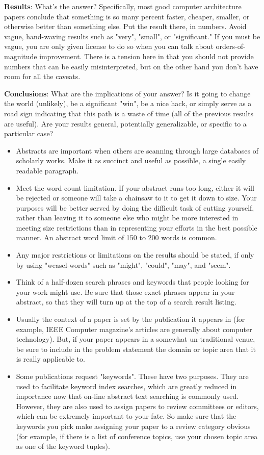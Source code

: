\documentclass[12pt,a4paper]{article}
\begin{document}
	 \textbf{Results}:
	 What's the answer? Specifically, most good computer architecture papers conclude that something is so many percent faster, cheaper, smaller, or otherwise better than something else. Put the result there, in numbers. Avoid vague, hand-waving results such as "very", "small", or "significant." If you must be vague, you are only given license to do so when you can talk about orders-of-magnitude improvement. There is a tension here in that you should not provide numbers that can be easily misinterpreted, but on the other hand you don't have room for all the caveats.
	 
	 \textbf{Conclusions}:
	 What are the implications of your answer? Is it going to change the world (unlikely), be a significant "win", be a nice hack, or simply serve as a road sign indicating that this path is a waste of time (all of the previous results are useful). Are your results general, potentially generalizable, or specific to a particular case?
	
	\begin{itemize}
		\item Abstracts are important when others are scanning through large databases of scholarly works. Make it as succinct and useful as possible, a single easily readable paragraph.
		\item Meet the word count limitation. If your abstract runs too long, either it will be rejected or someone will take a chainsaw to it to get it down to size. Your purposes will be better served by doing the difficult task of cutting yourself, rather than leaving it to someone else who might be more interested in meeting size restrictions than in representing your efforts in the best possible manner. An abstract word limit of 150 to 200 words is common.
		\item Any major restrictions or limitations on the results should be stated, if only by using "weasel-words" such as "might", "could", "may", and "seem".
		\item Think of a half-dozen search phrases and keywords that people looking for your work might use. Be sure that those exact phrases appear in your abstract, so that they will turn up at the top of a search result listing.
		\item Usually the context of a paper is set by the publication it appears in (for example, IEEE Computer magazine's articles are generally about computer technology). But, if your paper appears in a somewhat un-traditional venue, be sure to include in the problem statement the domain or topic area that it is really applicable to.
		\item Some publications request "keywords". These have two purposes. They are used to facilitate keyword index searches, which are greatly reduced in importance now that on-line abstract text searching is commonly used. However, they are also used to assign papers to review committees or editors, which can be extremely important to your fate. So make sure that the keywords you pick make assigning your paper to a review category obvious (for example, if there is a list of conference topics, use your chosen topic area as one of the keyword tuples).
	\end{itemize}
	
\end{document}
